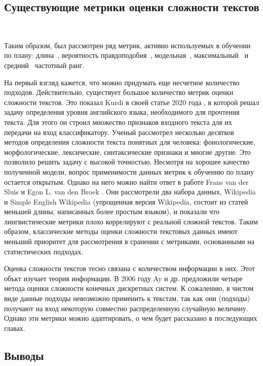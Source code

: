 \documentclass{spbau-diploma}
\begin{document}
\subsection{Существующие метрики оценки сложности текстов}
\ 

Таким образом, был рассмотрен ряд метрик, активно используемых в обучении по плану: длина~\cite{platanios2019competence, kocmi2017curriculum, zhang2018empirical}, вероятность правдоподобия~\cite{platanios2019competence}, модельная~\cite{xu2020curriculum}, максимальный~\cite{kocmi2017curriculum, zhang2018empirical} и средний~\cite{zhang2018empirical} частотный ранг.

На первый взгляд кажется, что можно придумать еще несчетное количество подходов. Действительно, существует большое количество метрик оценки сложности текстов. Это показал Kurdi в своей статье 2020 года \cite{kurdi2020text}, в которой решал задачу определения уровня английского языка, необходимого для прочтения текста. Для этого он строил множество признаков входного текста для их передачи на вход классификатору. Ученый рассмотрел несколько десятков методов определения сложности текста понятных для человека: фонологические, морфологические, лексические, синтаксические признаки и многие другие. Это позволило решить задачу с высокой точностью. Несмотря на хорошее качество полученной модели, вопрос применимости данных метрик к обучению по плану остается открытым. Однако на него можно найти ответ в работе Frans van der Sluis и Egon L. van den Broek \cite{van2010using}. Они рассмотрели два набора данных, Wikipedia и Simple English Wikipedia (упрощенная версия Wikipedia, состоит из статей меньшей длины, написанных более простым языком), и показали что лингвистические метрики плохо коррелируют с реальной сложной текстов. Таким образом, классические методы оценки сложности текстовых данных имеют меньший приоритет для рассмотрения в сранении с метриками, основанными на статистических подходах.

Оценка сложности текстов тесно связана с количеством информации в них. Этот объкт изучает теория информации. В 2006 году Ay и др. \cite{ay2006unifying} предложили четыре метода оценки сложности конечных дискретных систем. К сожалению, в чистом виде данные подходы невозможно применить к текстам, так как они (подходы) получают на вход некоторую совместно распределенную случайную величину. Однако эти метрики можно  адаптировать, о чем будет рассказано в последующих главах.

\subsection{Выводы}
\end{document}
